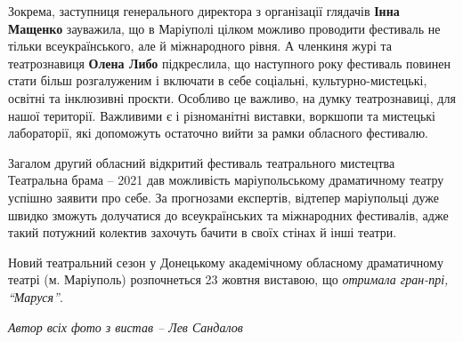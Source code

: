 
Зокрема, заступниця генерального директора з організації глядачів \textbf{Інна Мащенко}
зауважила, що в Маріуполі цілком можливо проводити фестиваль не тільки
всеукраїнського, але й міжнародного рівня. А членкиня журі та театрознавиця
\textbf{Олена Либо} підкреслила, що наступного року фестиваль повинен стати більш
розгалуженим і включати в себе соціальні, культурно-мистецькі, освітні та
інклюзивні проєкти. Особливо це важливо, на думку театрознавиці, для нашої
території. Важливими є і різноманітні виставки, воркшопи та мистецькі
лабораторії, які допоможуть остаточно вийти за рамки обласного фестивалю.

Загалом другий обласний відкритий фестиваль театрального мистецтва Театральна
брама – 2021 дав можливість маріупольському драматичному театру успішно заявити
про себе. За прогнозами експертів, відтепер маріупольці дуже швидко зможуть
долучатися до всеукраїнських та міжнародних фестивалів, адже такий потужний
колектив захочуть бачити  в своїх стінах й інші театри.

Новий театральний сезон у Донецькому академічному обласному драматичному театрі
(м. Маріуполь) розпочнеться 23 жовтня виставою, що \emph{отримала гран-прі, \enquote{Маруся}}.

\emph{Автор всіх фото з вистав – Лев Сандалов}
